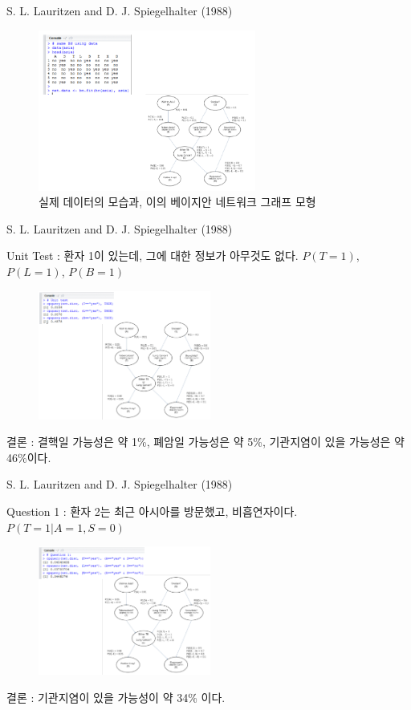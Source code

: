 \documentclass{beamer}
\begin{document}
\begin{frame}{S. L. Lauritzen and D. J. Spiegelhalter (1988)}

	\begin{figure}
		\includegraphics[height=150pt]{images/image83}
		\caption{\tiny{실제 데이터의 모습과, 이의 베이지안 네트워크 그래프 모형}}
	\end{figure}

\end{frame}


\begin{frame}{S. L. Lauritzen and D. J. Spiegelhalter (1988)}

{\scriptsize{}Unit Test : 환자 1이 있는데, 그에 대한 정보가 아무것도 없다. $P(T=1)$, $P(L=1)$, $P(B=1)$}

	\begin{figure}
		\includegraphics[height=120pt]{images/image84}
	\end{figure}

{\scriptsize{}결론 : 결핵일 가능성은 약 1\%, 폐암일 가능성은 약 5\%, 기관지염이 있을 가능성은 약 46\%이다.}

\end{frame}


\begin{frame}{S. L. Lauritzen and D. J. Spiegelhalter (1988)}

{\scriptsize{}Question 1 : 환자 2는 최근 아시아를 방문했고, 비흡연자이다. $P(T=1 | A=1, S=0)$}

	\begin{figure}
		\includegraphics[height=120pt]{images/image85}
	\end{figure}

{\scriptsize{}결론 : 기관지염이 있을 가능성이 약 34\% 이다.}

\end{frame}
\end{document}
